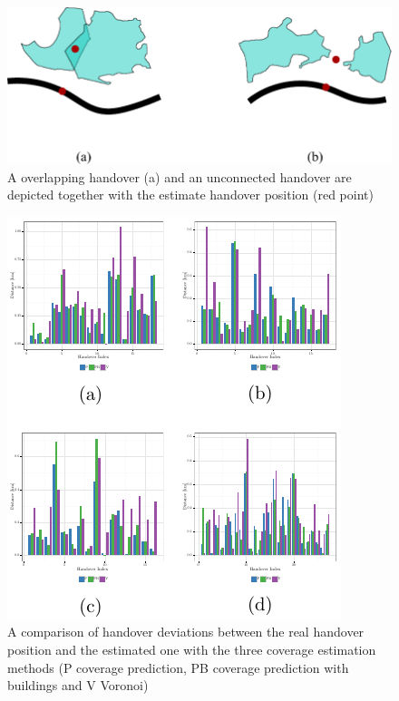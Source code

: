 \documentclass[twocolumn]{bmcart}%
\begin{document}
\begin{backmatter}
\begin{figure}[h!]
	\end{figure}
	\begin{figure}[h!]
		\label{fig:handover}
		\caption{ A overlapping handover (a) and an unconnected handover are depicted together with the estimate handover position (red point)
		}
		\includegraphics{handover}
	\end{figure}
	
	
	\begin{figure}[h!]
		\label{fig:handoverdeviation}
		\caption{ A comparison of handover deviations between the real handover position and the estimated one with the three coverage estimation methods (P coverage prediction, PB coverage prediction with buildings and V Voronoi)
		}
		\includegraphics{images/handoverDeviation}
	\end{figure}
	

\end{backmatter}
\end{document}
